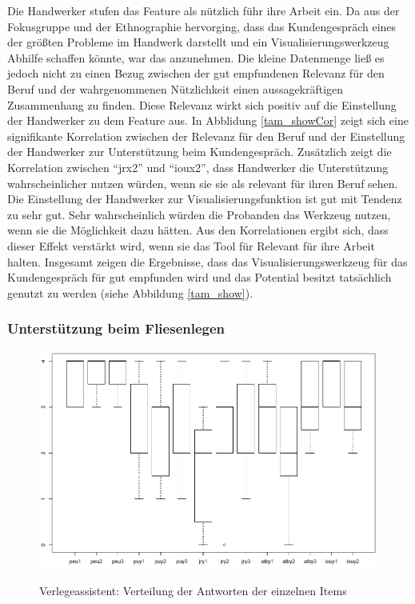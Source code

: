Die Handwerker stufen das Feature als nützlich führ ihre Arbeit ein. Da aus der Fokusgruppe und der Ethnographie hervorging, dass das Kundengespräch eines der größten Probleme im Handwerk darstellt und ein Visualisierungswerkzeug Abhilfe schaffen könnte, war das anzunehmen. Die kleine Datenmenge ließ es jedoch nicht zu einen Bezug zwischen der gut empfundenen Relevanz für den Beruf und der wahrgenommenen Nützlichkeit einen aussagekräftigen Zusammenhang zu finden. Diese Relevanz wirkt sich positiv auf die Einstellung der Handwerker zu dem Feature aus. In Abblidung \ref{tam_showCor} zeigt sich eine signifikante Korrelation zwischen der Relevanz für den Beruf und der Einstellung der Handwerker zur Unterstützung beim Kundengespräch. Zusätzlich zeigt die Korrelation zwischen \enquote{jrx2} und \enquote{ioux2}, dass Handwerker die Unterstützung wahrscheinlicher nutzen würden, wenn sie sie als relevant für ihren Beruf sehen. Die Einstellung der Handwerker zur Visualisierungsfunktion ist gut mit Tendenz zu sehr gut. Sehr wahrscheinlich würden die Probanden das Werkzeug nutzen, wenn sie die Möglichkeit dazu hätten. Aus den Korrelationen ergibt sich, dass dieser Effekt verstärkt wird, wenn sie das Tool für Relevant für ihre Arbeit halten. Insgesamt zeigen die Ergebnisse, dass das Visualisierungswerkzeug für das Kundengespräch für gut empfunden wird und das Potential besitzt tatsächlich genutzt zu werden (siehe Abbildung \ref{tam_show}).

\subsubsection{Unterstützung beim Fliesenlegen}
\label{kunde_assist}

\begin{figure}[h]
	\begin{center}
		\includegraphics[scale=0.5]{Resources/Evaluation/tam_assist.png}
		\label{tam_assist}
		\caption{Verlegeassistent: Verteilung der Antworten der einzelnen Items}	
	\end{center}
\end{figure}

